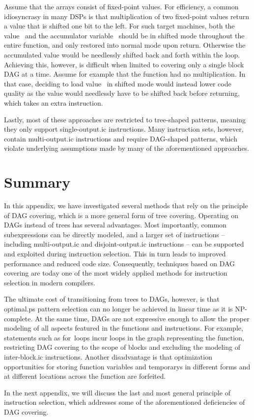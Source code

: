 %
Assume that the arrays consist of fixed-point values.
%
For efficiency, a common idiosyncrasy in many \glspl{DSP} is that multiplication
of two fixed-point values return a value that is shifted one bit to the left.
%
For such \glspl{target machine}, both the value~ and the accumulator
\gls{variable}~ should be in shifted mode throughout the entire
\gls{function}, and only restored into normal mode upon return.
%
Otherwise the accumulated value would be needlessly shifted back and forth
within the loop.
%
Achieving this, however, is difficult when limited to covering only a single
\gls{block DAG} at a time.
%
Assume for example that the function had no multiplication.
%
In that case, deciding to load value~ in shifted mode would instead
lower code quality as the value would needlessly have to be shifted back before
returning, which takes an extra \gls{instruction}.

Lastly, most of these approaches are restricted to tree-shaped \glspl{pattern},
meaning they only support \gls{single-output.ic} \glspl{instruction}.
%
Many \glspl{instruction set}, however, contain \gls{multi-output.ic}
\glspl{instruction} and require \gls{DAG}-shaped \glspl{pattern}, which violate
underlying assumptions made by many of the aforementioned approaches.


\section{Summary}

In this appendix, we have investigated several methods that rely on the
\gls{principle} of \gls{DAG covering}, which is a more general form of \gls{tree
  covering}.
%
Operating on \glspl{DAG} instead of \glspl{tree} has several advantages.
%
Most importantly, common subexpressions can be directly modeled, and a larger
set of \glspl{instruction} -- including \gls{multi-output.ic} and
\gls{disjoint-output.ic} \glspl{instruction} -- can be supported and exploited
during \gls{instruction selection}.
%
This in turn leads to improved performance and reduced code size.
%
Consequently, techniques based on \gls{DAG covering} are today one of the most
widely applied methods for \gls{instruction selection} in modern
\glspl{compiler}.

The ultimate cost of transitioning from \glspl{tree} to \glspl{DAG}, however, is
that \gls{optimal.ps} \gls{pattern selection} can no longer be achieved in
linear time as it is NP-complete.
%
At the same time, \glspl{DAG} are not expressive enough to allow the proper
modeling of all aspects featured in the \glspl{function} and
\glspl{instruction}.
%
For example, statements such as \mbox{for loops} incur \glspl{loop} in the
\gls{graph} representing the \gls{function}, restricting \gls{DAG covering} to
the scope of \glspl{block} and excluding the modeling of \gls{inter-block.ic}
\glspl{instruction}.
%
Another disadvantage is that optimization opportunities for storing
\gls{function} variables and \glspl{temporary} in different forms and at
different locations across the \gls{function} are forfeited.

In the next appendix, we will discuss the last and most general \gls{principle}
of \gls{instruction selection}, which addresses some of the aforementioned
deficiencies of \gls{DAG covering}.
